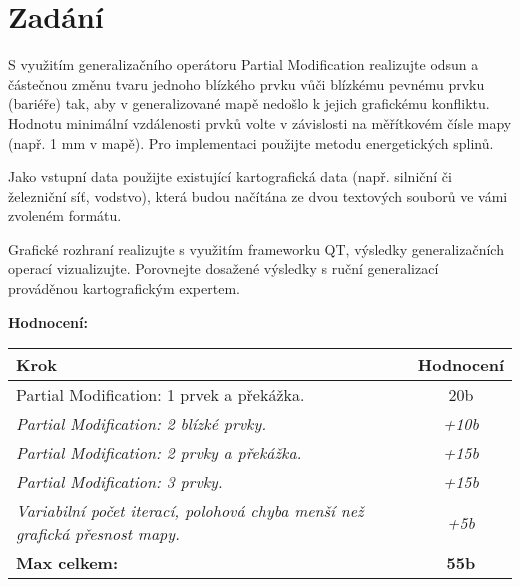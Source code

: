 \chapter*{Zadání}

\par S využitím generalizačního operátoru Partial Modification realizujte odsun a částečnou změnu tvaru jednoho blízkého prvku vůči blízkému pevnému prvku (bariéře) tak, aby v generalizované mapě nedošlo k jejich grafickému konfliktu. Hodnotu minimální vzdálenosti prvků  volte v závislosti na měřítkovém čísle mapy (např. 1 mm v mapě). Pro implementaci použijte metodu energetických splinů.
\par Jako vstupní data použijte existující kartografická data (např. silniční či železniční síť, vodstvo), která budou načítána ze dvou textových souborů ve vámi zvoleném formátu.
\par Grafické rozhraní realizujte s využitím frameworku QT, výsledky generalizačních operací vizualizujte. Porovnejte dosažené výsledky s ruční generalizací prováděnou kartografickým expertem.
\bigbreak

\par\textbf{\large Hodnocení:}
\bigbreak
\begin{center}
    \begin{tabular}{|p{14.2cm}|c|} 
     \hline\large
         \textbf{Krok} & \textbf{Hodnocení}\\ %
             \hline\hline
             \small Partial Modification: 1 prvek a překážka. & \small20b \\ 
             \hline
             \emph{\small Partial Modification: 2 blízké prvky.} & \emph{\small +10b} \\
             \hline
             \emph{\small Partial Modification: 2 prvky a překážka.} & \emph{\small +15b} \\
             \hline
             \emph{\small Partial Modification: 3 prvky.} & \emph{\small +15b} \\
             \hline
             \emph{\small Variabilní počet iterací, polohová chyba menší než grafická přesnost mapy.} & \emph{\small +5b}\\ 
             \hline
             \textbf{Max celkem:} & \textbf{55b}\\ %
             \hline
    \end{tabular}
\end{center}
